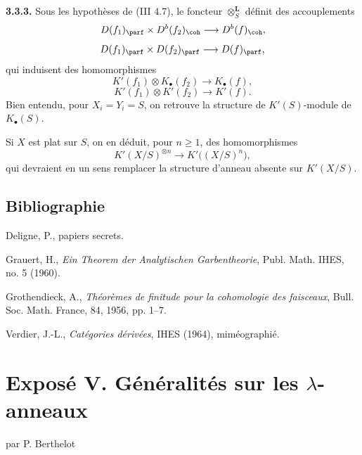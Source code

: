 \documentclass[11pt]{article}
\newcommand{\Fil}{\operatorname{Fil}}
\begin{document}
\textbf{3.3.3.} Sous les hypothèses de (III 4.7), le foncteur \(\otimes_S^{\mathbf L}\) définit des accouplements
\[
 D(f_1)_{\parf}\times D^b(f_2)_{\coh}\longrightarrow D^b(f)_{\coh},
\]
\[
 D(f_1)_{\parf}\times D(f_2)_{\parf}\longrightarrow D(f)_{\parf},
\]
qui induisent des homomorphismes
\[
 K'(f_1)\otimes K_{\bullet}(f_2)\longrightarrow K_{\bullet}(f),
\]
\[
 K'(f_1)\otimes K'(f_2)\longrightarrow K'(f).
\]
Bien entendu, pour \(X_i=Y_i=S\), on retrouve la structure de \(K'(S)\)-module de \(K_{\bullet}(S)\).

Si \(X\) est plat sur \(S\), on en déduit, pour \(n\geq1\), des homomorphismes
\[
 K'(X/S)^{\otimes n}\longrightarrow K'\bigl((X/S)^n\bigr),
\]
qui devraient en un sens remplacer la structure d'anneau absente sur \(K'(X/S)\).

\subsection*{Bibliographie}
\begin{enumerate}[label={[\arabic*]}]
\item Deligne, P., papiers secrets.
\item Grauert, H., \emph{Ein Theorem der Analytischen Garbentheorie}, Publ. Math. IHES, no. 5 (1960).
\item Grothendieck, A., \emph{Théorèmes de finitude pour la cohomologie des faisceaux}, Bull. Soc. Math. France, 84, 1956, pp. 1--7.
\item[{[V]}] Verdier, J.-L., \emph{Catégories dérivées}, IHES (1964), miméographié.
\end{enumerate}



\providecommand{\Chat}{\widehat C}
\providecommand{\Ghat}{\widehat G}
\providecommand{\Gg}{\widehat G_g}
\providecommand{\Ga}{\widehat G_a}
\providecommand{\Grhat}{\widehat{\operatorname{Gr}}}
\providecommand{\Abfil}{\mathrm{Ab\,fil}}
\providecommand{\Kalgfil}{K\text{-}\mathrm{Alg.fil.}}
\providecommand{\Hom}{\operatorname{Hom}}
\providecommand{\Sym}{\mathfrak S}
\providecommand{\id}{\operatorname{Id}}
\providecommand{\Log}{\operatorname{Log}}
\providecommand{\Toddc}{\operatorname{Todd}}
\providecommand{\Ob}{\operatorname{Ob}}
\providecommand{\cG}{\mathcal G}
\providecommand{\cCzero}{\mathcal C_0}
\providecommand{\Fil}{\operatorname{Fil}}


\section*{Exposé V. Généralités sur les \(\lambda\)-anneaux}
\begin{center}
par P. Berthelot
\end{center}
\end{document}
